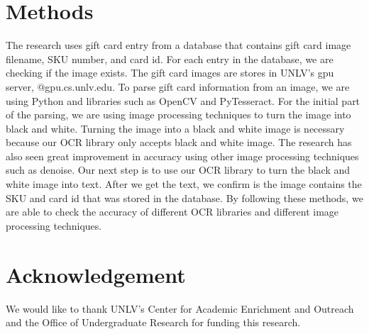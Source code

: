 \documentclass[conference]{IEEEtran}
\begin{document}
\section{Methods}\label{section:Methods}

The research uses gift card entry from a database that contains gift card image filename, SKU number, and card id. For each entry in the database, we are checking if the image exists. 
The gift card images are stores in UNLV’s gpu server, @gpu.cs.unlv.edu. To parse gift card information from an image, we are using Python and libraries such as OpenCV and PyTesseract. 
For the initial part of the parsing, we are using image processing techniques to turn the image into black and white. Turning the image into a black and white image is necessary because our OCR library only accepts black and white image. 
The research has also seen great improvement in accuracy using other image processing techniques such as denoise. Our next step is to use our OCR library to turn the black and white image into text. 
After we get the text, we confirm is the image contains the SKU and card id that was stored in the database. 
By following these methods, we are able to check the accuracy of different OCR libraries and different image processing techniques.\\

\section{Acknowledgement}\label{section:acknowledgement}
We would like to thank UNLV's Center for Academic Enrichment and Outreach and the Office of Undergraduate Research for funding this research. 




 
\end{document}

